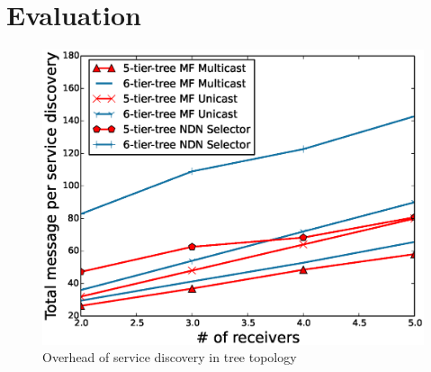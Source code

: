 \section{Evaluation}
\begin{figure}
\includegraphics[width=\columnwidth]{figure/service_discovery_overhead.eps}
\caption{\label{fig:service_over}Overhead of service discovery in tree topology}
\end{figure}

